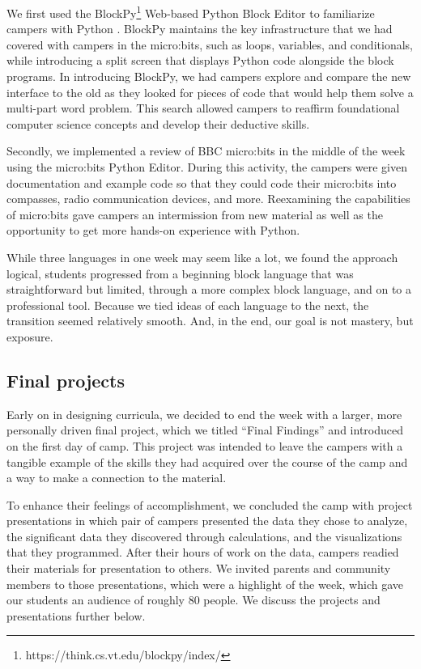 We first used the BlockPy\footnote{https://think.cs.vt.edu/blockpy/index/}
Web-based Python Block Editor to familiarize campers with Python
\cite{Bart2017}.  BlockPy maintains the key infrastructure that we
had covered with campers in the micro:bits, such as loops, variables,
and conditionals, while introducing a split screen that displays
Python code alongside the block programs. In introducing BlockPy,
we had campers explore and compare the new interface to the old as
they looked for pieces of code that would help them solve a multi-part
word problem. This search allowed campers to reaffirm foundational
computer science concepts and develop their deductive skills.

Secondly, we implemented a review of BBC micro:bits in the middle
of the week using the micro:bits Python Editor. During this activity,
the campers were given documentation and example code so that they
could code their micro:bits into compasses, radio communication
devices, and more. Reexamining the capabilities of micro:bits gave
campers an intermission from new material as well as the opportunity
to get more hands-on experience with Python.

While three languages in one week may seem like a lot, we found the
approach logical, students progressed from a beginning block language 
that was straightforward but limited, through a more complex block
language, and on to a professional tool.  Because we tied ideas of
each language to the next, the transition seemed relatively smooth.
And, in the end, our goal is not mastery, but exposure.

\subsection{Final projects}

Early on in designing curricula, we decided to end the week with a
larger, more personally driven final project, which we titled ``Final
Findings'' and introduced on the first day of camp.  This project
was intended to leave the campers with a tangible example of the
skills they had acquired over the course of the camp and a way to
make a connection to the material.

To enhance their feelings of accomplishment, we concluded the camp
with project presentations in which pair of campers presented the
data they chose to analyze, the significant data they discovered
through calculations, and the visualizations that they programmed.
After their hours of work on the data, campers readied their materials
for presentation to others.  We invited parents and community members
to those presentations, which were a highlight of the week, which
gave our students an audience of roughly 80 people.  We discuss the
projects and presentations further below.

